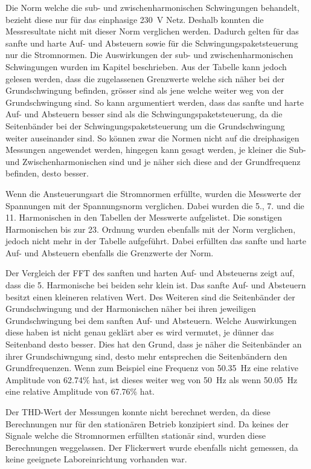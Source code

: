 Die Norm welche die sub- und zwischenharmonischen Schwingungen behandelt, bezieht diese nur für das einphasige \SI{230}{V} Netz. Deshalb konnten die Messresultate nicht mit dieser Norm verglichen werden. Dadurch gelten für das sanfte und harte Auf- und Absteuern sowie für die Schwingungspaketsteuerung nur die Stromnormen. Die Auswirkungen der sub- und zwischenharmonischen Schwingungen wurden im Kapitel  beschrieben. Aus der Tabelle  kann jedoch gelesen werden, dass die zugelassenen Grenzwerte welche sich näher bei der Grundschwingung befinden, grösser sind als jene welche weiter weg von der Grundschwingung sind. So kann argumentiert werden, dass das sanfte und harte Auf- und Absteuern besser sind als die Schwingungspaketsteuerung, da die Seitenbänder bei der Schwingungspaketsteuerung um die Grundschwingung weiter auseinander sind. So können zwar die Normen nicht auf die dreiphasigen Messungen angewendet werden, hingegen kann gesagt werden, je kleiner die Sub- und Zwischenharmonischen sind und je näher sich diese and der Grundfrequenz befinden, desto besser.

Wenn die Ansteuerungsart die Stromnormen erfüllte, wurden die Messwerte der Spannungen mit der Spannungsnorm  verglichen. Dabei wurden die 5., 7. und die 11. Harmonischen in den Tabellen der Messwerte aufgelistet. Die sonstigen Harmonischen bis zur 23. Ordnung wurden ebenfalls mit der Norm verglichen, jedoch nicht mehr in der Tabelle aufgeführt. Dabei erfüllten das sanfte und harte Auf- und Absteuern ebenfalls die Grenzwerte der Norm.

Der Vergleich der FFT des sanften und harten Auf- und Absteuerns zeigt auf, dass die 5. Harmonische bei beiden sehr klein ist. Das sanfte Auf- und Absteuern besitzt einen kleineren relativen Wert. Des Weiteren sind die Seitenbänder der Grundschwingung und der Harmonischen näher bei ihren jeweiligen Grundschwingung bei dem sanften Auf- und Absteuern. Welche Auswirkungen diese haben ist nicht genau geklärt aber es wird vermutet, je dünner das Seitenband desto besser. Dies hat den Grund, dass je näher die Seitenbänder an ihrer Grundschiwngung sind, desto mehr entsprechen die Seitenbändern den Grundfrequenzen. Wenn zum Beispiel eine Frequenz von \SI{50.35}{Hz} eine relative Amplitude von 62.74\% hat, ist dieses weiter weg von \SI{50}{Hz} als wenn \SI{50.05}{Hz} eine relative Amplitude von 67.76\% hat.

Der THD-Wert der Messungen konnte nicht berechnet werden, da diese Berechnungen nur für den stationären Betrieb konzipiert sind. Da keines der Signale welche die Stromnormen erfüllten stationär sind, wurden diese Berechnungen weggelassen. Der Flickerwert wurde ebenfalls nicht gemessen, da keine geeignete Laboreinrichtung vorhanden war.

